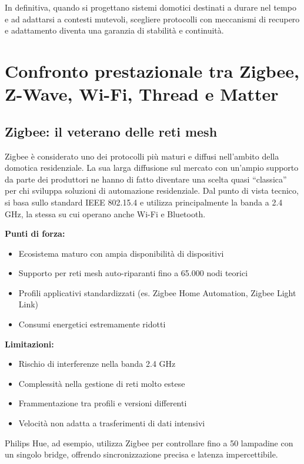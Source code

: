 In definitiva, quando si progettano sistemi domotici destinati a durare nel tempo e ad adattarsi a contesti mutevoli, scegliere protocolli con meccanismi di recupero e adattamento diventa una garanzia di stabilità e continuità.

\section{Confronto prestazionale tra Zigbee, Z-Wave, Wi-Fi, Thread e Matter}

\subsection{Zigbee: il veterano delle reti mesh}

Zigbee è considerato uno dei protocolli più maturi e diffusi nell’ambito della domotica residenziale. La sua larga diffusione sul mercato con un’ampio supporto da parte dei produttori ne hanno di fatto diventare una scelta quasi “classica” per chi sviluppa soluzioni di automazione residenziale. Dal punto di vista tecnico, si basa sullo standard IEEE 802.15.4 e utilizza principalmente la banda a 2.4 GHz, la stessa su cui operano anche Wi-Fi e Bluetooth.

\textbf{Punti di forza:}
\begin{itemize}
    \item Ecosistema maturo con ampia disponibilità di dispositivi
    \item Supporto per reti mesh auto-riparanti fino a 65.000 nodi teorici
    \item Profili applicativi standardizzati (es. Zigbee Home Automation, Zigbee Light Link)
    \item Consumi energetici estremamente ridotti
\end{itemize}

\textbf{Limitazioni:}
\begin{itemize}
    \item Rischio di interferenze nella banda 2.4 GHz
    \item Complessità nella gestione di reti molto estese
    \item Frammentazione tra profili e versioni differenti
    \item Velocità non adatta a trasferimenti di dati intensivi
\end{itemize}

Philips Hue, ad esempio, utilizza Zigbee per controllare fino a 50 lampadine con un singolo bridge, offrendo sincronizzazione precisa e latenza impercettibile.

